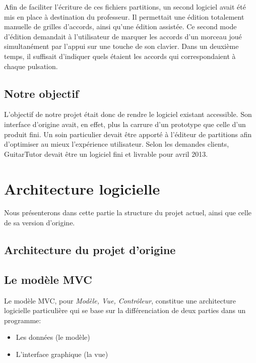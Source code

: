 \documentclass[a4paper,11pt]{article}
\begin{document}
Afin de faciliter l'écriture de ces fichiers partitions, un second logiciel avait été mis en place à destination du professeur. Il permettait une édition totalement manuelle de grilles d'accords, ainsi qu'une édition assistée. Ce second mode d'édition demandait à l'utilisateur de marquer les accords d'un morceau joué simultanément par l'appui sur une touche de son clavier. Dans un deuxième temps, il suffisait d'indiquer quels étaient les accords qui correspondaient à chaque pulsation.

\subsection*{Notre objectif}

L'objectif de notre projet était donc de rendre le logiciel existant accessible. Son interface d'origine avait, en effet, plus la carrure d'un prototype que celle d'un produit fini. Un soin particulier devait être apporté à l'éditeur de partitions afin d'optimiser au mieux l'expérience utilisateur. Selon les demandes clients, GuitarTutor devait être un logiciel fini et livrable pour avril 2013.

\clearpage

\tableofcontents

\clearpage

\section{Architecture logicielle}

Nous présenterons dans cette partie la structure du projet actuel, ainsi que celle de sa version d'origine.

\subsection{Architecture du projet d'origine}

\subsection{Le modèle MVC}

Le modèle MVC, pour \textit{Modèle, Vue, Contrôleur}, constitue une architecture logicielle particulière qui se base sur la différenciation de deux parties dans un programme:
\begin{itemize}
 \item Les données (le modèle)
 \item L'interface graphique (la vue)
\end{itemize}
\end{document}

